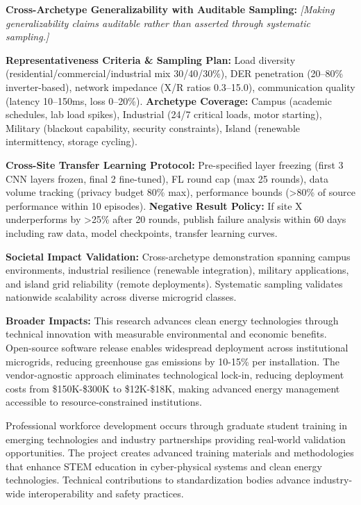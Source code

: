 \documentclass[12pt]{article}
\begin{document}
\textbf{Cross-Archetype Generalizability with Auditable Sampling:} \textit{[Making generalizability claims auditable rather than asserted through systematic sampling.]} 

\textbf{Representativeness Criteria \& Sampling Plan:} Load diversity (residential/commercial/industrial mix 30/40/30\%), DER penetration (20--80\% inverter-based), network impedance (X/R ratios 0.3--15.0), communication quality (latency 10--150ms, loss 0--20\%). \textbf{Archetype Coverage:} Campus (academic schedules, lab load spikes), Industrial (24/7 critical loads, motor starting), Military (blackout capability, security constraints), Island (renewable intermittency, storage cycling).

\textbf{Cross-Site Transfer Learning Protocol:} Pre-specified layer freezing (first 3 CNN layers frozen, final 2 fine-tuned), FL round cap (max 25 rounds), data volume tracking (privacy budget 80\% max), performance bounds (>80\% of source performance within 10 episodes). \textbf{Negative Result Policy:} If site X underperforms by >25\% after 20 rounds, publish failure analysis within 60 days including raw data, model checkpoints, transfer learning curves.

\textbf{Societal Impact Validation:} Cross-archetype demonstration spanning campus environments, industrial resilience (renewable integration), military applications, and island grid reliability (remote deployments). Systematic sampling validates nationwide scalability across diverse microgrid classes.

\textbf{Broader Impacts:} This research advances clean energy technologies through technical innovation with measurable environmental and economic benefits. Open-source software release enables widespread deployment across institutional microgrids, reducing greenhouse gas emissions by 10-15\% per installation. The vendor-agnostic approach eliminates technological lock-in, reducing deployment costs from \$150K-\$300K to \$12K-\$18K, making advanced energy management accessible to resource-constrained institutions.

Professional workforce development occurs through graduate student training in emerging technologies and industry partnerships providing real-world validation opportunities. The project creates advanced training materials and methodologies that enhance STEM education in cyber-physical systems and clean energy technologies. Technical contributions to standardization bodies advance industry-wide interoperability and safety practices.
\end{document}
